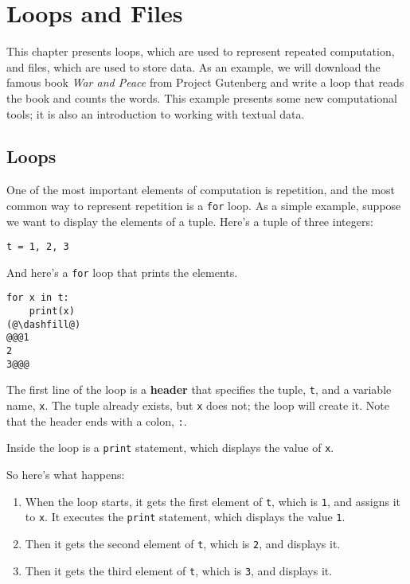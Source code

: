 \hypertarget{loops-and-files}{%
\chapter{Loops and Files}\label{loops-and-files}}

This chapter presents loops, which are used to represent repeated
computation, and files, which are used to store data. As an example, we
will download the famous book \emph{War and Peace} from Project
Gutenberg and write a loop that reads the book and counts the words.
This example presents some new computational tools; it is also an
introduction to working with textual data.

\hypertarget{loops}{%
\section{Loops}\label{loops}}

One of the most important elements of computation is repetition, and the
most common way to represent repetition is a
\passthrough{\lstinline!for!} loop. As a simple example, suppose we want
to display the elements of a tuple. Here's a tuple of three integers:

\begin{lstlisting}[]
t = 1, 2, 3
\end{lstlisting}

And here's a \passthrough{\lstinline!for!} loop that prints the
elements.

\begin{lstlisting}[]
for x in t:
    print(x)
(@\dashfill@)
@@@1
2
3@@@
\end{lstlisting}

The first line of the loop is a \textbf{header} that specifies the
tuple, \passthrough{\lstinline!t!}, and a variable name,
\passthrough{\lstinline!x!}. The tuple already exists, but
\passthrough{\lstinline!x!} does not; the loop will create it. Note that
the header ends with a colon, \passthrough{\lstinline!:!}.

Inside the loop is a \passthrough{\lstinline!print!} statement, which
displays the value of \passthrough{\lstinline!x!}.

So here's what happens:

\begin{enumerate}
\def\labelenumi{\arabic{enumi}.}
\item
  When the loop starts, it gets the first element of
  \passthrough{\lstinline!t!}, which is \passthrough{\lstinline!1!}, and
  assigns it to \passthrough{\lstinline!x!}. It executes the
  \passthrough{\lstinline!print!} statement, which displays the value
  \passthrough{\lstinline!1!}.
\item
  Then it gets the second element of \passthrough{\lstinline!t!}, which
  is \passthrough{\lstinline!2!}, and displays it.
\item
  Then it gets the third element of \passthrough{\lstinline!t!}, which
  is \passthrough{\lstinline!3!}, and displays it.
\end{enumerate}

